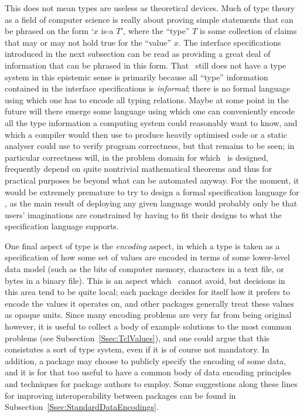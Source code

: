 \documentclass{mtmtcl}
\theoremstyle{plain}
\theoremstyle{remark}
\begin{document}
This does not mean types are useless as theoretical devices. Much of 
type theory as a field of computer science is really about proving 
simple statements that can be phrased on the form `$x$ is-a $T$', 
where the ``type'' $T$ is some collection of claims that may or 
may not hold true for the ``value'' $x$. The interface specifications 
introduced in the next subsection can be read as providing a great deal 
of information that can be phrased in this form. That \mtl\ still 
does not have a type system in this epistemic sense is primarily 
because all ``type'' information contained in the interface 
specifications is \emph{informal}; there is no formal language using 
which one has to encode all typing relations. Maybe at some point in 
the future will there emerge some language using which one can 
conveniently encode all the type information a computing system 
could reasonably want to know, and which a compiler would then use to 
produce heavily optimised code or a static analyser could use to 
verify program correctness, but that remains to be seen; in 
particular correctness will, in the problem domain for which \mtl\ is 
designed, frequently depend on quite nontrivial mathematical theorems 
and thus for practical purposes be beyond what can be automated anyway. 
For the moment, it would be extremely premature to try to design a 
formal specification language for \mtl, as the main result of 
deploying any given language would probably only be that users' 
imaginations are constrained by having to fit their designs to 
what the specification language supports.

One final aspect of type is the \emph{encoding} aspect, in which a 
type is taken as a specification of how some set of values are 
encoded in terms of some lower-level data model (such as the bits of 
computer memory, characters in a text file, or bytes in a binary file). 
This is an aspect which \mtl\ cannot avoid, but decisions in this area 
tend to be quite local; each package decides for itself how it prefers 
to encode the values it operates on, and other packages generally treat 
these values as opaque units. Since many encoding problems are very 
far from being original however, it is useful to collect a body of 
example solutions to the most common problems (see 
Subsection~\ref{Ssec:TclValues}), and one could argue that this 
consistutes a sort of type system, even if it is of course 
not mandatory. In addition, a package may choose to publicly specify 
the encoding of some data, and it is for that too useful to have a 
common body of data encoding principles and techniques for package 
authors to employ. Some suggestions along these lines for improving 
interoperability between packages can be found in 
Subsection~\ref{Ssec:StandardDataEncodings}.
\end{document}

